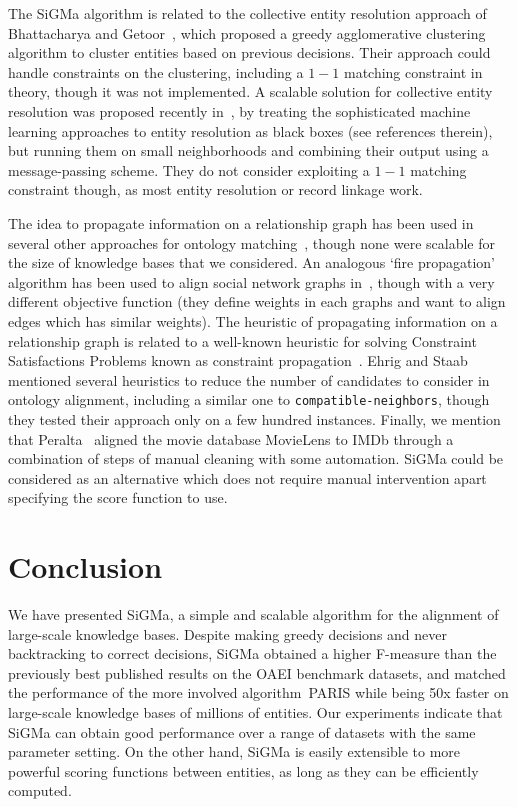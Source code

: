 \documentclass{sig-alternate}
\newcommand{\ts}[1]{\textsf{#1}}
\begin{document}
%
The \ts{SiGMa} algorithm is related to the collective entity resolution approach of Bhattacharya and Getoor~\cite{getoor07relational}, which proposed a greedy agglomerative clustering algorithm to cluster entities based on previous decisions. Their approach could handle constraints on the clustering, including a $1-1$ matching constraint in theory, though it was not implemented. A scalable solution for collective entity resolution was proposed recently in~\cite{restogi11largeEM}, by treating the sophisticated machine learning approaches to entity resolution as black boxes (see references therein), but running them on small neighborhoods and combining their output using a message-passing scheme. They do not consider exploiting a $1-1$ matching constraint though, as most entity resolution or record linkage work.

The idea to propagate information on a relationship graph has been used in several other approaches for ontology matching~\cite{hu05GMO,mao07network}, though none were scalable for the size of knowledge bases that we considered. An analogous `fire propagation' algorithm has been used to align social network graphs in~\cite{narayanan11deanonymization}, though with a very different objective function (they define weights in each graphs and want to align edges which has similar weights). The heuristic of propagating information on a relationship graph is related to a well-known heuristic for solving Constraint Satisfactions Problems known as constraint propagation~\cite{bessiere2006constraint}. Ehrig and Staab~\cite{ehrig04QOM} mentioned several heuristics to reduce the number of candidates to consider in ontology alignment, including a similar one to \texttt{compatible-neighbors}, though they tested their approach only on a few hundred instances. Finally, we mention that Peralta~\cite{peralta07movieMatching} aligned the movie database MovieLens to IMDb through a combination of steps of manual cleaning with some automation. \ts{SiGMa} could be considered as an alternative which does not require manual intervention apart specifying the score function to use.

%
%

%

%
%
%
%
%
%
%
%

\section{Conclusion}
We have presented \ts{SiGMa}, a simple and scalable algorithm for the alignment of large-scale knowledge bases. Despite making greedy decisions and never backtracking to correct decisions, \ts{SiGMa} obtained a higher F-measure than the previously best published results on the OAEI benchmark datasets, and matched the performance of the more involved algorithm~\ts{PARIS} while being 50x faster on large-scale knowledge bases of millions of entities. Our experiments indicate that \ts{SiGMa} can obtain good performance over a range of datasets with the same parameter setting. On the other hand, \ts{SiGMa} is easily extensible to more powerful scoring functions between entities, as long as they can be efficiently computed.
\end{document}
